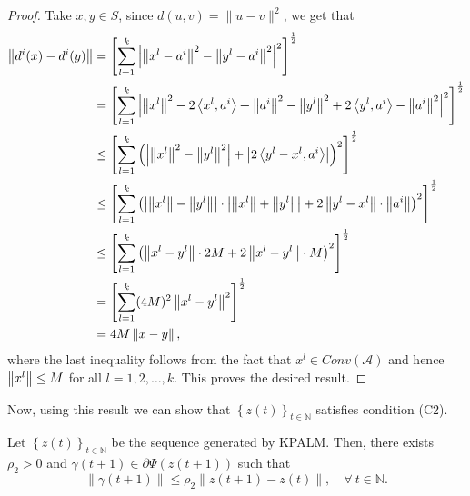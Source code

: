 \begin{proof}
Take $x,y \in S$, since $d(u,v) = \| u-v \|^2$, we get that
\begin{align*} 
	\left\Vert {d^i(x)  - d^i(y)} \right\Vert 
	&= \left[ \sum\limits_{l=1}^{k} \left\lvert \left\Vert {x^l - a^i} \right\Vert^2 - \left\Vert { y^l -a^i} \right\Vert^2 \right\rvert^2 \right]^{\frac{1}{2}} \\
	&= \left[ \sum\limits_{l=1}^{k} \left\lvert \left\Vert {x^l} \right\Vert^2 - 2\left\langle x^l,a^i \right\rangle + \left\Vert {a^i} \right\Vert^2 - \left\Vert {y^l} \right\Vert^2 + 2\left\langle y^l,a^i \right\rangle - \left\Vert {a^i} \right\Vert^2 \right\rvert ^2 \right]^{\frac{1}{2}} \\ 
	&\leq \left[ \sum\limits_{l=1}^{k} \left( \left\lvert \left\Vert {x^l} \right\Vert^2 - \left\Vert {y^l} \right\Vert^2 \right\rvert + \left\lvert 2\left\langle y^l - x^l , a^i \right\rangle \right\rvert \right)^2 \right]^{\frac{1}{2}} \\ 
	&\leq \left[ \sum\limits_{l=1}^{k} \left( \left\lvert \left\Vert {x^l} \right\Vert - \left\Vert {y^l} \right\Vert \right\rvert \cdot \left\lvert \left\Vert {x^l} \right\Vert + \left\Vert {y^l} \right\Vert \right\rvert + 2 \left\Vert {y^l - x^l} \right\Vert \cdot \left\Vert {a^i} \right\Vert \right)^2 \right]^{\frac{1}{2}} \\
	&\leq \left[ \sum\limits_{l=1}^{k} \left( \left\Vert {x^l - y^l} \right\Vert \cdot 2M + 2 \left\Vert {x^l - y^l} \right\Vert\cdot M \right)^2 \right]^{\frac{1}{2}} \\
	&= \left[ \sum\limits_{l=1}^{k} (4M)^2 \left\Vert {x^l - y^l} \right\Vert^2 \right]^{\frac{1}{2}} \\
	&= 4M \left\Vert {x - y} \right\Vert ,
\end{align*}
where the last inequality follows from the fact that $x^l \in Conv(\mathcal{A})$ and hence $\left\Vert {x^l} \right\Vert \leq M$ for all $l=1,2,\ldots,k$. This proves the desired result.
\end{proof}

Now, using this result we can show that $\left\lbrace z(t) \right\rbrace_{t \in \mathbb{N}}$ satisfies condition (C2).

\begin{proposition} \label{Subgradient_proof_KPALM}
Let $\left\lbrace z(t) \right\rbrace_{t \in \mathbb{N}}$ be the sequence generated by KPALM. Then, there exists $\rho_2 > 0$ and $\gamma(t+1) \in \partial \Psi(z(t+1))$ such that 
\begin{equation*}
	\| \gamma(t+1)\| \leq \rho_2 \|z(t+1) - z(t)\|, \quad \forall \: t \in \mathbb{N} .
\end{equation*}

\end{proposition}

